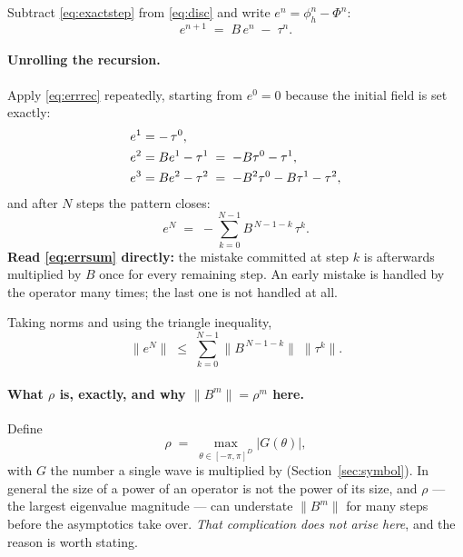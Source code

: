 \documentclass[11pt,a4paper]{article}
\begin{document}
Subtract \eqref{eq:exactstep} from \eqref{eq:disc} and write \(e^n = \phi_h^n - \Phi^n\):
\begin{equation}
  e^{n+1} \;=\; B\,e^{n} \;-\; \tau^{n}.
  \label{eq:errrec}
\end{equation}

\paragraph{Unrolling the recursion.} Apply \eqref{eq:errrec} repeatedly, starting from
\(e^0 = 0\) because the initial field is set exactly:
\begin{align}
  e^{1} &= -\,\tau^{0}, \notag\\
  e^{2} &= B e^{1} - \tau^{1} \;=\; -B\tau^{0} - \tau^{1}, \notag\\
  e^{3} &= B e^{2} - \tau^{2} \;=\; -B^{2}\tau^{0} - B\tau^{1} - \tau^{2}, \notag
\end{align}
and after \(N\) steps the pattern closes:
\begin{equation}
  e^{N} \;=\; -\sum_{k=0}^{N-1} B^{\,N-1-k}\,\tau^{k}.
  \label{eq:errsum}
\end{equation}
\textbf{Read \eqref{eq:errsum} directly:} the mistake committed at step \(k\) is afterwards
multiplied by \(B\) once for every remaining step. An early mistake is handled by the operator
many times; the last one is not handled at all.

Taking norms and using the triangle inequality,
\begin{equation}
  \|e^{N}\| \;\le\; \sum_{k=0}^{N-1} \bigl\|B^{\,N-1-k}\bigr\|\;\|\tau^{k}\| .
  \label{eq:errnorm}
\end{equation}

\paragraph{What \(\rho\) is, exactly, and why \(\|B^m\| = \rho^m\) here.}
Define
\begin{equation}
  \rho \;=\; \max_{\theta\in[-\pi,\pi]^D} \bigl|G(\theta)\bigr| ,
\end{equation}
with \(G\) the number a single wave is multiplied by (Section~\ref{sec:symbol}). In general the
size of a power of an operator is not the power of its size, and \(\rho\) --- the largest
eigenvalue magnitude --- can understate \(\|B^m\|\) for many steps before the asymptotics take
over. \emph{That complication does not arise here}, and the reason is worth stating.
\end{document}
